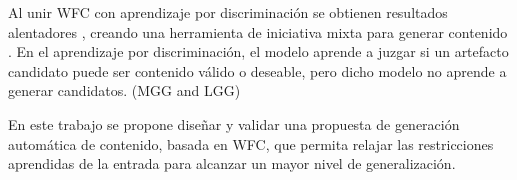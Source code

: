 Al unir WFC con aprendizaje por discriminación se obtienen resultados
alentadores \cite{bib:3}, creando una herramienta de iniciativa mixta 
para generar contenido \cite{bib:4}. En el aprendizaje por 
discriminación, el modelo aprende a juzgar si un artefacto candidato
puede ser contenido válido o deseable, pero dicho modelo no aprende
a generar candidatos. (MGG and LGG)

En este trabajo se propone diseñar y validar una propuesta de generación
automática de contenido, basada en WFC, que permita relajar las restricciones 
aprendidas de la entrada para alcanzar un mayor nivel de generalización.



